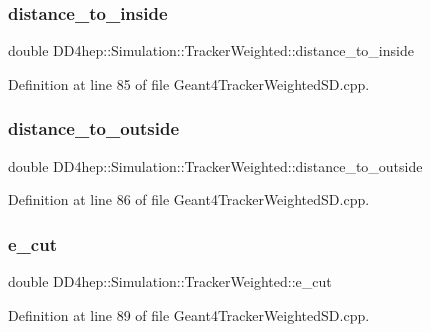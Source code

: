 \subsubsection{\texorpdfstring{distance\+\_\+to\+\_\+inside}{distance\_to\_inside}}
{\footnotesize\ttfamily double D\+D4hep\+::\+Simulation\+::\+Tracker\+Weighted\+::distance\+\_\+to\+\_\+inside}



Definition at line 85 of file Geant4\+Tracker\+Weighted\+S\+D.\+cpp.

\hypertarget{struct_d_d4hep_1_1_simulation_1_1_tracker_weighted_ad898a4f6ed0a4424a2bd8f7d52292c32}{}\label{struct_d_d4hep_1_1_simulation_1_1_tracker_weighted_ad898a4f6ed0a4424a2bd8f7d52292c32} 
\subsubsection{\texorpdfstring{distance\+\_\+to\+\_\+outside}{distance\_to\_outside}}
{\footnotesize\ttfamily double D\+D4hep\+::\+Simulation\+::\+Tracker\+Weighted\+::distance\+\_\+to\+\_\+outside}



Definition at line 86 of file Geant4\+Tracker\+Weighted\+S\+D.\+cpp.

\hypertarget{struct_d_d4hep_1_1_simulation_1_1_tracker_weighted_a404e62198a8830c8e6b7c185873bb4d1}{}\label{struct_d_d4hep_1_1_simulation_1_1_tracker_weighted_a404e62198a8830c8e6b7c185873bb4d1} 
\subsubsection{\texorpdfstring{e\+\_\+cut}{e\_cut}}
{\footnotesize\ttfamily double D\+D4hep\+::\+Simulation\+::\+Tracker\+Weighted\+::e\+\_\+cut}



Definition at line 89 of file Geant4\+Tracker\+Weighted\+S\+D.\+cpp.

\hypertarget{struct_d_d4hep_1_1_simulation_1_1_tracker_weighted_a1205a645db026a115eb182e439929818}{}\label{struct_d_d4hep_1_1_simulation_1_1_tracker_weighted_a1205a645db026a115eb182e439929818} 
